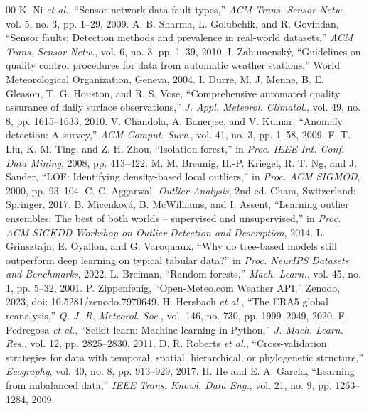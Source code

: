 \documentclass[conference]{IEEEtran}
\begin{document}
\begin{thebibliography}{00}
 K. Ni \emph{et al.}, ``Sensor network data fault types,'' \emph{ACM Trans. Sensor
Netw.}, vol. 5, no. 3, pp. 1--29, 2009.
 A. B. Sharma, L. Golubchik, and R. Govindan, ``Sensor faults: Detection methods
and prevalence in real-world datasets,'' \emph{ACM Trans. Sensor Netw.}, vol. 6, no. 3, pp. 1--39,
2010.
 I. Zahumensk\'{y}, ``Guidelines on quality control procedures for data from
automatic weather stations,'' World Meteorological Organization, Geneva, 2004.
 I. Durre, M. J. Menne, B. E. Gleason, T. G. Houston, and R. S. Vose,
``Comprehensive automated quality assurance of daily surface observations,'' \emph{J. Appl.
Meteorol. Climatol.}, vol. 49, no. 8, pp. 1615--1633, 2010.
 V. Chandola, A. Banerjee, and V. Kumar, ``Anomaly detection: A survey,''
\emph{ACM Comput. Surv.}, vol. 41, no. 3, pp. 1--58, 2009.
 F. T. Liu, K. M. Ting, and Z.-H. Zhou, ``Isolation forest,'' in \emph{Proc. IEEE
Int. Conf. Data Mining}, 2008, pp. 413--422.
 M. M. Breunig, H.-P. Kriegel, R. T. Ng, and J. Sander, ``LOF: Identifying
density-based local outliers,'' in \emph{Proc. ACM SIGMOD}, 2000, pp. 93--104.
 C. C. Aggarwal, \emph{Outlier Analysis}, 2nd ed. Cham, Switzerland: Springer,
2017.
 B. Micenkov\'{a}, B. McWilliams, and I. Assent, ``Learning outlier ensembles:
The best of both worlds -- supervised and unsupervised,'' in \emph{Proc. ACM SIGKDD Workshop on
Outlier Detection and Description}, 2014.
 L. Grinsztajn, E. Oyallon, and G. Varoquaux, ``Why do tree-based models
still outperform deep learning on typical tabular data?'' in \emph{Proc. NeurIPS Datasets and
Benchmarks}, 2022.
 L. Breiman, ``Random forests,'' \emph{Mach. Learn.}, vol. 45, no. 1,
pp. 5--32, 2001.
 P. Zippenfenig, ``Open-Meteo.com Weather API,'' Zenodo, 2023,
doi: 10.5281/zenodo.7970649.
 H. Hersbach \emph{et al.}, ``The ERA5 global reanalysis,'' \emph{Q. J. R.
Meteorol. Soc.}, vol. 146, no. 730, pp. 1999--2049, 2020.
 F. Pedregosa \emph{et al.}, ``Scikit-learn: Machine learning in Python,''
\emph{J. Mach. Learn. Res.}, vol. 12, pp. 2825--2830, 2011.
 D. R. Roberts \emph{et al.}, ``Cross-validation strategies for data with
temporal, spatial, hierarchical, or phylogenetic structure,'' \emph{Ecography}, vol. 40, no. 8,
pp. 913--929, 2017.
 H. He and E. A. Garcia, ``Learning from imbalanced data,'' \emph{IEEE Trans. Knowl.
Data Eng.}, vol. 21, no. 9, pp. 1263--1284, 2009.
\end{thebibliography}
\end{document}
